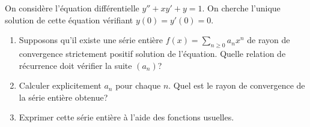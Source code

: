 \documentclass{book}
\begin{document}
\begin{Exercice}
On considère l'équation différentielle $y''+xy'+y=1$. On cherche l'unique solution de
cette équation vérifiant $y(0)=y'(0)=0$.
\begin{enumerate}
\item Supposons qu'il existe une série entière $f(x)=\sum_{n\geq 0}a_nx^n$ de rayon de convergence strictement positif
solution de l'équation. Quelle relation de récurrence doit vérifier la suite $(a_n)$?
\item Calculer explicitement $a_n$ pour chaque $n$. Quel est le rayon de convergence de la série entière obtenue?
\item Exprimer cette série entière à l'aide des fonctions usuelles.
\end{enumerate}
\begin{Correction}
\end{Correction}
\end{Exercice}
\end{document}
